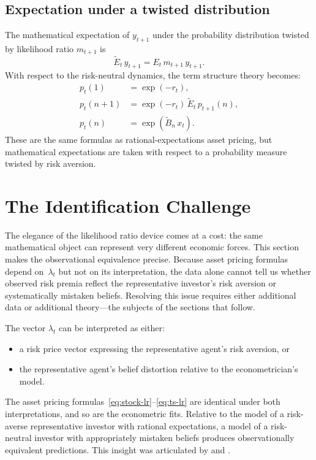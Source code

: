 \documentclass[12pt]{article}
\theoremstyle{definition}
\begin{document}
\subsection{Expectation under a twisted distribution}

The mathematical expectation of $y_{t+1}$ under the probability
distribution twisted by likelihood ratio $m_{t+1}$ is
\[
   \tilde E_t\, y_{t+1} = E_t\, m_{t+1}\, y_{t+1}.
\]
With respect to the risk-neutral dynamics, the term structure theory
becomes:
\begin{align*}
p_t(1) &= \exp(-r_t), \\
p_t(n+1) &= \exp(-r_t)\, \tilde E_t\, p_{t+1}(n), \\
p_t(n) &= \exp(\tilde B_n\, x_t).
\end{align*}
These are the same formulas as rational-expectations asset pricing, but
mathematical expectations are taken with respect to a probability
measure {\color{red} twisted by risk aversion}.


\section{The Identification Challenge}
\label{sec:identification}

The elegance of the likelihood ratio device comes at a cost: the same
mathematical object can represent very different economic forces.  This
section makes the observational equivalence precise.  Because asset
pricing formulas depend on~$\lambda_t$ but not on its interpretation,
the data alone cannot tell us whether observed risk premia reflect the
representative investor's risk aversion or systematically mistaken
beliefs.  Resolving this issue requires either additional data
or additional theory---the subjects of the sections that follow.

The vector $\lambda_t$ can be interpreted as either:
\begin{itemize}
\item a risk price vector expressing the representative agent's risk
      aversion, or
\item the representative agent's belief distortion relative to the
      econometrician's model.
\end{itemize}
The asset pricing formulas~\eqref{eq:stock-lr}--\eqref{eq:ts-lr} are
identical under both interpretations, and so are the econometric fits.
Relative to the model of a risk-averse representative investor with
rational expectations, a model of a risk-neutral investor with
appropriately mistaken beliefs produces observationally equivalent
predictions.  This insight was articulated by \citet{HST1999} and \citet{PSS2015}.
\end{document}
